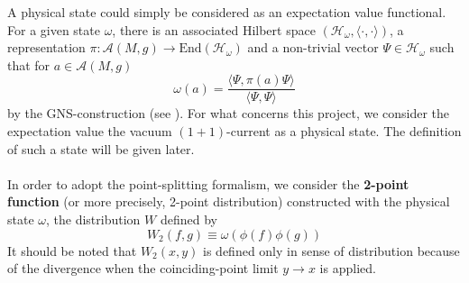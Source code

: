 A physical state could simply be considered as an expectation value functional. 
For a given state $\omega$, there is an associated Hilbert space $(\mathscr{H}_\omega, \langle \cdot, \cdot \rangle)$, a representation $\pi : \mathscr{A}(M,g)\rightarrow \mathrm{End}(\mathscr{H}_\omega)$ and a non-trivial vector $\Psi \in \mathscr{H}_\omega$ such that for $a \in \mathscr{A}(M,g)$
\begin{equation*}
\omega(a) = \frac{\langle \Psi, \pi(a)\Psi\rangle}{\langle \Psi, \Psi \rangle}
\end{equation*}
by the GNS-construction (see \eg\cite{bar2009quantum}).
For what concerns this project, we consider the expectation value the vacuum $(1+1)$-current as a physical state.
The definition of such a state will be given later. \\\\
%
In order to adopt the point-splitting formalism, 
we consider the \textbf{2-point function} (or more precisely, 2-point distribution) constructed with the physical state $\omega$, 
\ie the distribution $W$ defined by 
\begin{equation*}
W_2(f, g ) \equiv \omega(\phi(f) \phi(g))
\end{equation*}
It should be noted that $W_2(x,y)$ is defined only in sense of distribution because of the divergence when the coinciding-point limit $y\rightarrow x$ is applied.
